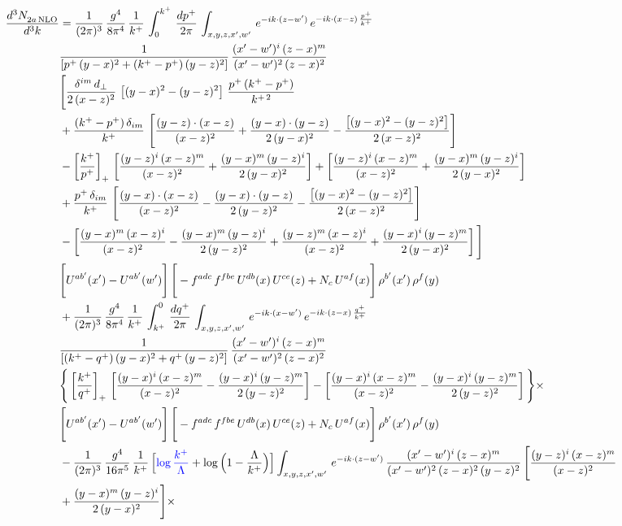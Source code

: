\documentclass[9pt]{article}
\numberwithin{equation}{section}
\begin{document}
\begin{align}
    \frac{d^{3}N_{2a\,\rm NLO}^{\rm}}{d^{3}k}  & =  \frac{1}{(2\pi)^{3}}\, \frac{g^{4}}{8\pi^{4}}\,\frac{1}{k^{+}}\,\int_{0}^{k^{+}}\, \frac{dp^{+}}{2\pi}\,\int_{x,y,z,x',w'}\, e^{-ik\cdot(z-w')}\,e^{-ik\cdot (x-z)\,\frac{p^{+}}{k^{+}}}\,\notag \\ & \frac{1}{\left[p^{+}\,(y-x)^{2}+(k^{+}-p^{+})\,(y-z)^{2}\right]}\, \frac{(x'-w')^{i}\,(z-x)^{m}}{(x'-w')^{2}\,(z-x)^{2}} \notag \\ & \Bigg[\frac{\delta^{im}\,d_{\perp}}{2\,(x-z)^{2}}\,\left[(y-x)^{2}-(y-z)^{2}\right]\,\frac{p^{+}\,(k^{+}-p^{+})}{k^{+\,2}}\notag \\ & +\frac{(k^{+}-p^{+})\,\delta_{im}}{k^{+}}\,\left[\frac{(y-z)\cdot (x-z)}{(x-z)^{2}}+\frac{(y-x)\cdot (y-z)}{2\,(y-x)^{2}}-\frac{\left[(y-x)^{2}-(y-z)^{2}\right]}{2\,(x-z)^{2}}\right]\notag \\ & -\left[\frac{k^{+}}{p^{+}}\right]_{+}\,\left[\frac{(y-z)^{i}\,(x-z)^{m}}{(x-z)^{2}}+\frac{(y-x)^{m}\,(y-z)^{i}}{2\,(y-x)^{2}}\right]+ \left[\frac{(y-z)^{i}\,(x-z)^{m}}{(x-z)^{2}}+\frac{(y-x)^{m}\,(y-z)^{i}}{2\,(y-x)^{2}}\right]\notag \\ & +\frac{p^{+}\,\delta_{im}}{k^{+}}\,\left[\frac{(y-x)\cdot (x-z)}{(x-z)^{2}}-\frac{(y-x)\cdot (y-z)}{2\,(y-z)^{2}}-\frac{\left[(y-x)^{2}-(y-z)^{2}\right]}{2\,(x-z)^{2}}\right]\notag \\ &-\left[\frac{(y-x)^{m}\,(x-z)^{i}}{(x-z)^{2}}-\frac{(y-x)^{m}\,(y-z)^{i}}{2\,(y-z)^{2}}+\frac{(y-z)^{m}\,(x-z)^{i}}{(x-z)^{2}}+\frac{(y-x)^{i}\,(y-z)^{m}}{2\,(y-x)^{2}}\right]\Bigg] \notag \\ & \Bigg[U^{ab'}(x')-U^{ab'}(w')\Bigg]\,\Bigg[-f^{adc}\,f^{fbe}\,U^{db}(x)\,U^{ce}(z)+N_{c}\,U^{af}(x)\Bigg]\,\rho^{b'}(x')\,\rho^{f}(y)\notag \\ & + \frac{1}{(2\pi)^{3}}\,\frac{g^{4}}{8\pi^{4}}\,\frac{1}{k^{+}}\, \int^{0}_{k^{+}}\, \frac{dq^{+}}{2\pi} \,  \int_{x,y,z,x',w'}\,e^{-ik\cdot(x-w')}\,e^{-ik\cdot (z-x)\,\frac{q^{+}}{k^{+}}}\,\notag \\ & \frac{1}{\left[(k^{+}-q^{+})\,(y-x)^{2}+q^{+}\,(y-z)^{2}\right]}\, \frac{(x'-w')^{i}\,(z-x)^{m}}{(x'-w')^{2}\,(z-x)^{2}} \notag \\ &\Bigg\{\left[\frac{k^{+}}{q^{+}}\right]_{+}\,\left[\frac{(y-x)^{i}\,(x-z)^{m}}{(x-z)^{2}}-\frac{(y-x)^{i}\,(y-z)^{m}}{2\,(y-z)^{2}}\right] -\left[\frac{(y-x)^{i}\,(x-z)^{m}}{(x-z)^{2}}-\frac{(y-x)^{i}\,(y-z)^{m}}{2\,(y-z)^{2}}\right]\Bigg\}\times\,\notag \\ & \Bigg[U^{ab'}(x')-U^{ab'}(w')\Bigg]\,\Bigg[-f^{adc}\,f^{fbe}\,U^{db}(x)\,U^{ce}(z)+N_{c}\,U^{af}(x)\Bigg]\,\rho^{b'}(x')\,\rho^{f}(y)\notag \\ & - \frac{1}{(2\pi)^{3}}\, \frac{g^{4}}{16\pi^{5}}\,\frac{1}{k^{+}}\,\Big[{\color{blue}\log\frac{k^{+}}{\Lambda}}+\log\Big(1-\frac{\Lambda}{k^{+}}\Big)\Big] \int_{x,y,z,x',w'}\,e^{-ik\cdot(z-w')}\, \frac{(x'-w')^{i}\,(z-x)^{m}}{(x'-w')^{2}\,(z-x)^{2}\, (y-z)^{2}}\,\Bigg[\frac{(y-z)^{i}\,(x-z)^{m}}{(x-z)^{2}}\notag \\ & +\frac{(y-x)^{m}\,(y-z)^{i}}{2\,(y-x)^{2}}\Bigg]\times\, 
\end{align}
\end{document}
